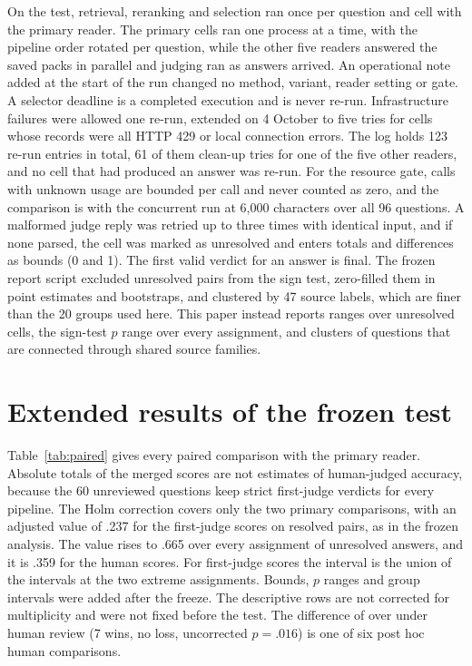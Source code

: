 On the test, retrieval, reranking and selection ran once per question and cell with the primary reader.
The primary cells ran one process at a time, with the pipeline order rotated per question, while the other five readers answered the saved packs in parallel and judging ran as answers arrived.
An operational note added at the start of the run changed no method, variant, reader setting or gate.
A selector deadline is a completed execution and is never re-run.
Infrastructure failures were allowed one re-run, extended on 4 October to five tries for cells whose records were all HTTP 429 or local connection errors.
The log holds 123 re-run entries in total, 61 of them clean-up tries for one of the five other readers, and no cell that had produced an answer was re-run.
For the resource gate, calls with unknown usage are bounded per call and never counted as zero, and the comparison is with the concurrent \hybrid{} run at 6,000 characters over all 96 questions.
A malformed judge reply was retried up to three times with identical input, and if none parsed, the cell was marked as unresolved and enters totals and differences as bounds (0 and 1).
The first valid verdict for an answer is final.
The frozen report script excluded unresolved pairs from the sign test, zero-filled them in point estimates and bootstraps, and clustered by 47 source labels, which are finer than the 20 groups used here.
This paper instead reports ranges over unresolved cells, the sign-test $p$ range over every assignment, and clusters of questions that are connected through shared source families.

\section{Extended results of the frozen test}
\label{app:stats}
Table~\ref{tab:paired} gives every paired comparison with the primary reader.
Absolute totals of the merged scores are not estimates of human-judged accuracy, because the 60 unreviewed questions keep strict first-judge verdicts for every pipeline.
The Holm correction covers only the two primary comparisons, with an adjusted value of .237 for the first-judge scores on resolved pairs, as in the frozen analysis. The value rises to .665 over every assignment of unresolved answers, and it is .359 for the human scores.
For first-judge scores the interval is the union of the intervals at the two extreme assignments.
Bounds, $p$ ranges and group intervals were added after the freeze.
The descriptive rows are not corrected for multiplicity and were not fixed before the test.
The difference of \setr{} over \hybrid{} under human review (7 wins, no loss, uncorrected $p=.016$) is one of six post hoc human comparisons.


